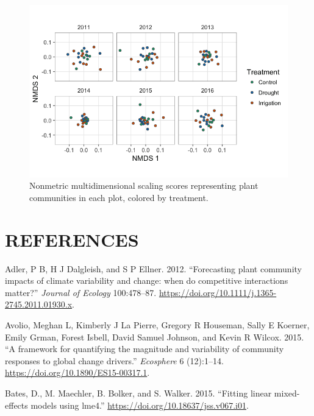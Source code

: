 \documentclass[fleqn,10pt,lineno]{wlpeerj} %
\begin{document}
\begin{figure}[!ht]
  \centering
      \includegraphics[width=5in]{../figures/sppcomp_bray_all.png}
  \caption{Nonmetric multidimensional scaling scores representing plant communities in each plot, colored by treatment. }
\end{figure}

\newpage{}

\hypertarget{references}{%
\section*{REFERENCES}\label{references}}

\hypertarget{refs}{}
\leavevmode\hypertarget{ref-Adler2012}{}%
Adler, P B, H J Dalgleish, and S P Ellner. 2012. ``Forecasting plant
community impacts of climate variability and change: when do competitive
interactions matter?'' \emph{Journal of Ecology} 100:478--87.
\url{https://doi.org/10.1111/j.1365-2745.2011.01930.x}.

\leavevmode\hypertarget{ref-Avolio2015}{}%
Avolio, Meghan L, Kimberly J La Pierre, Gregory R Houseman, Sally E
Koerner, Emily Grman, Forest Isbell, David Samuel Johnson, and Kevin R
Wilcox. 2015. ``A framework for quantifying the magnitude and
variability of community responses to global change drivers.''
\emph{Ecosphere} 6 (12):1--14.
\url{https://doi.org/10.1890/ES15-00317.1}.

\leavevmode\hypertarget{ref-Bates2015}{}%
Bates, D., M. Maechler, B. Bolker, and S. Walker. 2015. ``Fitting linear
mixed-effects models using lme4.''
\url{https://doi.org/10.18637/jss.v067.i01}.
\end{document}
